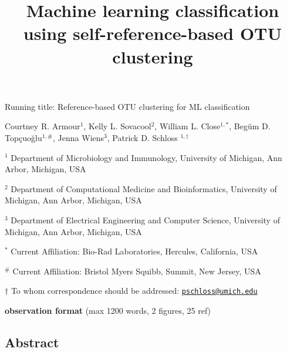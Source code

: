\documentclass[
]{article}
\title{\textbf{Machine learning classification using
self-reference-based OTU clustering}}
\author{}
\date{\vspace{-2.5em}}
\begin{document}
\maketitle

Running title: Reference-based OTU clustering for ML classification

\vspace{10mm}

Courtney R. Armour\({^1}\), Kelly L. Sovacool\({^2}\), William L.
Close\(^{1,*}\), Begüm D. Topçuoğlu\(^{1,\#}\), Jenna Wiens\({^3}\),
Patrick D. Schloss \(^{1,\dagger}\)

\vspace{10mm}

\({^1}\) Department of Microbiology and Immunology, University of
Michigan, Ann Arbor, Michigan, USA

\({^2}\) Department of Computational Medicine and Bioinformatics,
University of Michigan, Ann Arbor, Michigan, USA

\({^3}\) Department of Electrical Engineering and Computer Science,
University of Michigan, Ann Arbor, Michigan, USA

\({^*}\) Current Affiliation: Bio-Rad Laboratories, Hercules,
California, USA

\({^\#}\) Current Affiliation: Bristol Myers Squibb, Summit, New Jersey,
USA

\(\dagger\) To whom correspondence should be addressed:
\href{mailto:pschloss@umich.edu}{\nolinkurl{pschloss@umich.edu}}

\vspace{10mm}

\textbf{observation format} (max 1200 words, 2 figures, 25 ref)

\newpage

\linenumbers

\hypertarget{abstract}{%
\subsection{Abstract}\label{abstract}}
\end{document}
